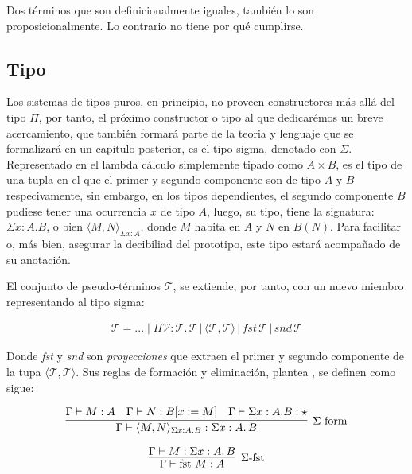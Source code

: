 \begin{corollary}
    Dos términos que son definicionalmente iguales, también lo son proposicionalmente. Lo contrario no tiene por qué cumplirse.
\end{corollary}

\subsection{Tipo \Sigma}
Los sistemas de tipos puros, en principio, no proveen constructores más allá del tipo $\Pi$, por tanto, el próximo constructor o tipo al que dedicarémos un breve acercamiento, que también formará parte de la teoria y lenguaje que se formalizará en un capitulo posterior, es el tipo sigma, denotado con $\Sigma$. Representado en el lambda cálculo simplemente tipado como $A \times B$, es el tipo de una tupla en el que el primer y segundo componente son de tipo $A$ y $B$ respecivamente, sin embargo, en los tipos dependientes, el segundo componente $B$ pudiese tener una ocurrencia $x$ de tipo $A$, luego, su tipo, tiene la signatura: $\Sigma x : A . B$, o bien $\langle M, N \rangle_{\Sigma x : A}$, donde $M$ habita en $A$ y $N$ en $B(N)$. Para facilitar o, más bien, asegurar la decibiliad del prototipo, este tipo estará acompañado de su anotación.

El conjunto de pseudo-términos $\mathcal{T}$, se extiende, por tanto, con un nuevo miembro representando al tipo sigma:

\begin{align*}
  \mathcal{T} = ... \mid \Pi \mathcal{V}: \mathcal{T}.\, \mathcal{T} \,|\, \langle \mathcal{T}, \mathcal{T} \rangle\, |\, \textit{fst}\,\mathcal{T}\,|\, \textit{snd}\, \mathcal{T}
\end{align*}

    Donde \textit{fst} y \textit{snd} son \textit{proyecciones} que extraen el primer y segundo componente de la tupa $\langle \mathcal{T}, \mathcal{T} \rangle$. Sus reglas de formación y eliminación, plantea \cite{barthe-coquand}, se definen como sigue:
    

\begin{gather}
  \infer[\text{$\Sigma$-form}]
  {\Gamma \vdash \langle M, N\rangle_{\Sigma x : A . B} : \Sigma x : A .\, B}
  {\Gamma \vdash M : A & \Gamma \vdash N : B [x := M] & \Gamma \vdash \Sigma x : A. B : \star}
\end{gather}

\begin{gather}
  \infer[\text{$\Sigma$-fst}]
  {\Gamma \vdash \mathrm{fst}\ M : A}
  {\Gamma \vdash M : \Sigma x : A . \,B}
\end{gather}

